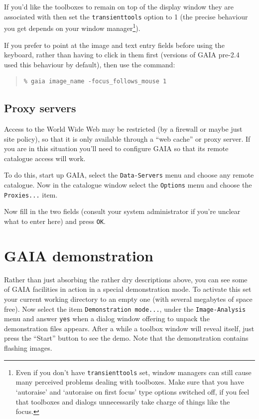 \documentclass[twoside,11pt]{article}
\newcommand{\xlabel}[1]{}
\renewcommand{\_}{\texttt{\symbol{95}}}
\newcommand{\mytt}[1]{{\texttt{#1}}}
\begin{document}
If you'd like the toolboxes to remain on top of the display window
they are associated with then set the \mytt{transient\_tools} option
to 1 (the precise behaviour you get depends on your window
manager\footnote{Even if you don't have \mytt{transient\_tools} set,
window managers can still cause many perceived problems dealing with
toolboxes. Make sure that you have `autoraise' and `autoraise on first
focus' type options switched off, if you feel that toolboxes and
dialogs unnecessarily take charge of things like the focus.}).

If you prefer to point at the image and text entry fields before using
the keyboard, rather than having to click in them first (versions of
GAIA pre-2.4 used this behaviour by default), then use the command:
\begin{quote}
\begin{verbatim}
% gaia image_name -focus_follows_mouse 1
\end{verbatim}
\end{quote}

\subsection{\xlabel{proxy_servers}Proxy servers}
Access to the World Wide Web may be restricted (by a firewall or maybe
just site policy), so that it is only available through a ``web
cache'' or proxy server. If you are in this situation you'll need to
configure GAIA so that its remote catalogue access will work.

To do this, start up GAIA, select the \mytt{Data-Servers} menu and
choose any remote catalogue. Now in the catalogue window select the
\mytt{Options} menu and choose the \mytt{Proxies...} item.

Now fill in the two fields (consult your system administrator if you're
unclear what to enter here) and press \mytt{OK}.

\section{\xlabel{gaia_demonstration}GAIA demonstration}
Rather than just absorbing the rather dry descriptions above, you can
see some of GAIA facilities in action in a special demonstration
mode. To activate this set your current working directory to an empty
one (with several megabytes of space free). Now select the item
\mytt{Demonstration mode...}, under the \mytt{Image-Analysis} menu and
answer \mytt{yes} when a dialog window offering to unpack the
demonstration files appears. After a while a toolbox window will
reveal itself, just press the ``Start'' button to see the demo. Note
that the demonstration contains flashing images.
\end{document}
